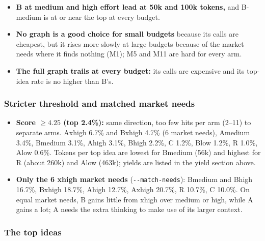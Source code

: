 \begin{itemize}
\tightlist
\item
  \textbf{B at medium and high effort lead at 50k and 100k tokens,} and B-medium is at or near the top at every budget.
\item
  \textbf{No graph is a good choice for small budgets} because its calls are cheapest, but it rises more slowly at large budgets because of the market needs where it finds nothing (M1); M5 and M11 are hard for every arm.
\item
  \textbf{The full graph trails at every budget:} its calls are expensive and its top-idea rate is no higher than B's.
\end{itemize}

\hypertarget{stricter-threshold-and-matched-market-needs}{%
\subsubsection{Stricter threshold and matched market needs}\label{stricter-threshold-and-matched-market-needs}}

\begin{itemize}
\tightlist
\item
  \textbf{Score $\ge 4.25$ (top 2.4\%):} same direction, too few hits per arm (2--11) to separate arms. A\textperiodcentered{}xhigh 6.7\% and B\textperiodcentered{}xhigh 4.7\% (6 market needs), A\textperiodcentered{}medium 3.4\%, B\textperiodcentered{}medium 3.1\%, A\textperiodcentered{}high 3.1\%, B\textperiodcentered{}high 2.2\%, C 1.2\%, B\textperiodcentered{}low 1.2\%, R 1.0\%, A\textperiodcentered{}low 0.6\%. Tokens per top idea are lowest for B\textperiodcentered{}medium (56k) and highest for R (about 260k) and A\textperiodcentered{}low (463k); yields are listed in the yield section above.
\item
  \textbf{Only the 6 xhigh market needs} (\texttt{-\/-match-needs}): B\textperiodcentered{}medium and B\textperiodcentered{}high 16.7\%, B\textperiodcentered{}xhigh 18.7\%, A\textperiodcentered{}high 12.7\%, A\textperiodcentered{}xhigh 20.7\%, R 10.7\%, C 10.0\%. On equal market needs, B gains little from xhigh over medium or high, while A gains a lot; A needs the extra thinking to make use of its larger context.
\end{itemize}

\hypertarget{top-ideas}{%
\subsubsection{The top ideas}\label{top-ideas}}

